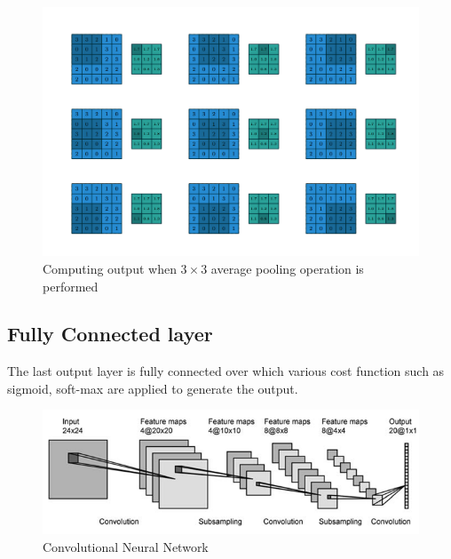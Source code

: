 \begin{figure}[H]
  \centering
    \includegraphics[scale=.4, angle=0]{Files/Pooling.png}
    \caption[Pooling Operation]{Computing output when $3 \times 3$ average pooling operation is performed \cite{1603.07285}}
    \label{fig:Pooling}
\end{figure}

\subsection{Fully Connected layer}
The last output layer is fully connected  over which various cost function such as sigmoid, soft-max are applied to generate the output.


\begin{figure}[H]
  \centering
    \includegraphics[scale=.6, angle=0]{Files/cnn-2.png}
    \caption[Convolutional Neural Network]{Convolutional Neural Network}
    \label{fig:CNN}
\end{figure}